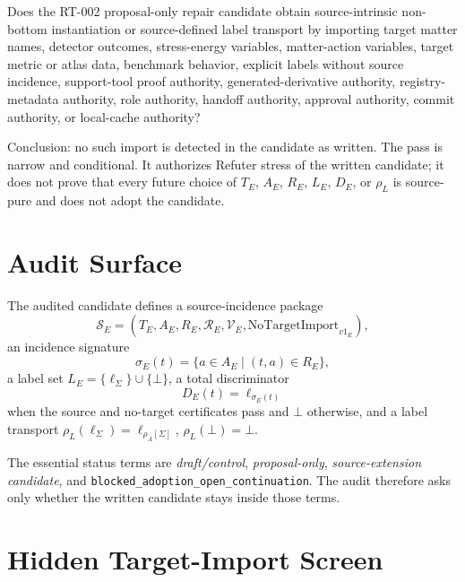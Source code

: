 \documentclass[11pt]{article}
\newcommand{\Bottom}{\bot}
\newcommand{\NoTarget}{\mathrm{NoTargetImport}_{v1}}
\begin{document}
Does the RT-002 proposal-only repair candidate obtain source-intrinsic
non-bottom instantiation or source-defined label transport by importing target
matter names, detector outcomes, stress-energy variables, matter-action
variables, target metric or atlas data, benchmark behavior, explicit labels
without source incidence, support-tool proof authority, generated-derivative
authority, registry-metadata authority, role authority, handoff authority,
approval authority, commit authority, or local-cache authority?

Conclusion: no such import is detected in the candidate as written. The pass
is narrow and conditional. It authorizes Refuter stress of the written
candidate; it does not prove that every future choice of \(T_E\), \(A_E\),
\(R_E\), \(L_E\), \(D_E\), or \(\rho_L\) is source-pure and does not adopt
the candidate.

\section{Audit Surface}

The audited candidate defines a source-incidence package
\[
  \mathcal{S}_E=(T_E,A_E,R_E,\mathcal{R}_E,\mathcal{V}_E,\NoTarget_E),
\]
an incidence signature
\[
  \sigma_E(t)=\{a\in A_E\mid (t,a)\in R_E\},
\]
a label set \(L_E=\{\ell_\Sigma\}\cup\{\Bottom\}\), a total discriminator
\[
  D_E(t)=\ell_{\sigma_E(t)}
\]
when the source and no-target certificates pass and \(\Bottom\) otherwise,
and a label transport \(\rho_L(\ell_\Sigma)=\ell_{\rho_A[\Sigma]}\),
\(\rho_L(\Bottom)=\Bottom\).

The essential status terms are \emph{draft/control}, \emph{proposal-only},
\emph{source-extension candidate}, and
\texttt{blocked\_adoption\_open\_continuation}. The audit therefore asks only
whether the written candidate stays inside those terms.

\section{Hidden Target-Import Screen}
\end{document}
